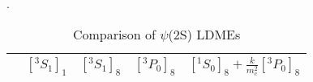 \documentclass[aps,prc,preprint,superscriptaddress,showpacs,showkeys,amsmath]{revtex4-1}
\begin{document}
\begin{table}[h]
\caption{Comparison of $\psi$(2S) LDMEs}.
\begin{tabular}{ccccc}
\hline            
          &$[^3S_1]_{1}$  &$[^3S_1]_{8}$  &$[^3P_0]_{8}$   &$[^1S_{0}]_{8}+\frac{k}{m_{c}^2}[^3P_0]_{8}$\\
\hline
\end{tabular}
\label{table:LDMEJPsi}
\end{table}











\ \\
\end{document}
